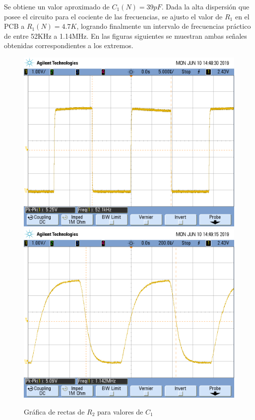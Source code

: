 \documentclass[assd_tp3_main.tex]{subfiles}
\begin{document}
Se obtiene un valor aproximado de $C_1(N) = 39pF$. Dada la alta dispersión que posee el circuito para el cociente de las frecuencias, se ajusto el valor de $R_1$ en el PCB a $R_1(N) = 4.7K$, logrando finalmente un intervalo de frecuencias práctico de entre 52KHz a 1.14MHz. En las figuras siguientes se muestran ambas señales obtenidas correspondientes a los extremos.

\begin{figure}[!ht]
\begin{centering}
\includegraphics[scale=0.2]{../EJ4/Mediciones/Clk/clk_min.png}
\includegraphics[scale=0.2]{../EJ4/Mediciones/Clk/clk_max.png}
\par\end{centering}
\caption{Gráfica de rectas de $R_2$ para valores de $C_1$}
\end{figure}
\end{document}
